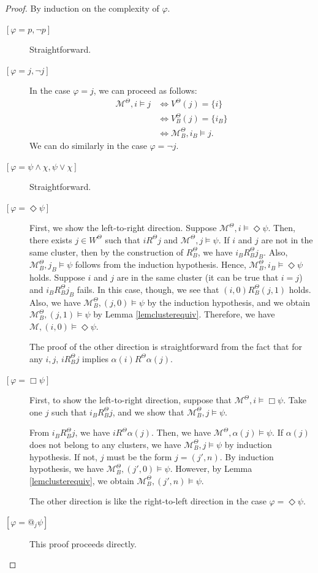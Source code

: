 \documentclass{article}
\theoremstyle{definition}
\newcommand{\Dia}{\Diamond}
\newcommand{\Kmodel}{\mathcal{M}}
\begin{document}
\begin{proof}
    By induction on the complexity of $\varphi$.
    \begin{description}
        \item[{$[\varphi = p, \neg p]$}] Straightforward.
        \item[{$[\varphi = j, \neg j]$}] In the case $\varphi = j$, we can proceed as follows:
        \begin{align*}
            \Kmodel^\Theta, i \models j &\iff V^\Theta(j) = \{ i \} \\
            &\iff V^\Theta_B(j) = \{ i_B \} \\
            &\iff \Kmodel^\Theta_B, i_B \models j .
        \end{align*}
        We can do similarly in the case $\varphi = \neg j$.
        \item[{$[\varphi = \psi \land \chi, \psi \lor \chi]$}] Straightforward.
        \item[{$[\varphi = \Dia \psi]$}] First, we show the left-to-right direction. Suppose $\Kmodel^\Theta, i \models \Dia \psi$. Then, there exists $j \in W^\Theta$ such that $i R^\Theta j$ and $\Kmodel^\Theta, j \models \psi$. If $i$ and $j$ are not in the same cluster, then by the construction of $R^\Theta_B$, we have $i_B R^\Theta_B j_B$. Also, $\Kmodel^\Theta_B, j_B \models \psi$ follows from the induction hypothesis. Hence, $\Kmodel^\Theta_B, i_B \models \Dia \psi$ holds. Suppose $i$ and $j$ are in the same cluster (it can be true that $i = j$) and $i_B R^\Theta_B j_B$ fails. In this case, though, we see that $(i, 0) R^\Theta_B (j, 1)$ holds. Also, we have $\Kmodel^\Theta_B, (j, 0) \models \psi$ by the induction hypothesis, and we obtain $\Kmodel^\Theta_B, (j, 1) \models \psi$ by Lemma \ref{lemclusterequiv}. Therefore, we have $\Kmodel, (i, 0) \models \Dia \psi$. 

        The proof of the other direction is straightforward from the fact that for any $i, j$, $i R^\Theta_B j$ implies $\alpha(i) R^\Theta \alpha(j)$. 
        \item[{$[\varphi = \Box \psi]$}] First, to show the left-to-right direction, suppose that $\Kmodel^\Theta, i \models \Box \psi$. Take one $j$ such that $i_B R^\Theta_B j$, and we show that $\Kmodel^\Theta_B, j \models \psi$.

        From $i_B R^\Theta_B j$, we have $i R^\Theta \alpha(j)$. Then, we have $\Kmodel^\Theta, \alpha(j) \models \psi$. If $\alpha(j)$ does not belong to any clusters, we have $\Kmodel^\Theta_B, j \models \psi$ by induction hypothesis. If not, $j$ must be the form $j = (j', n)$. By induction hypothesis, we have $\Kmodel^\Theta_B, (j', 0) \models \psi$. However, by Lemma \ref{lemclusterequiv}, we obtain $\Kmodel^\Theta_B, (j', n) \models \psi$.

        The other direction is like the right-to-left direction in the case $\varphi = \Dia \psi$. 
        \item[{$[\varphi = @_j \psi]$}] This proof proceeds directly. \qedhere
    \end{description}
\end{proof}
\end{document}
